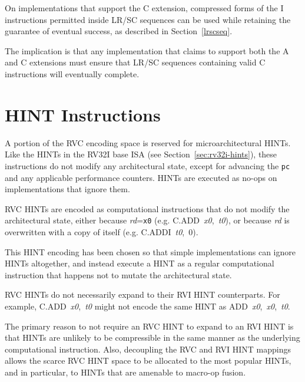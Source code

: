 On implementations that support the C extension, compressed forms of
the I instructions permitted inside LR/SC sequences can be used while
retaining the guarantee of eventual success, as described in
Section~\ref{lrscseq}.

\begin{commentary}
The implication is that any implementation that claims to support both
the A and C extensions must ensure that LR/SC sequences containing
valid C instructions will eventually complete.
\end{commentary}

\section{HINT Instructions}
\label{sec:rvc-hints}

A portion of the RVC encoding space is reserved for microarchitectural HINTs.
Like the HINTs in the RV32I base ISA (see Section~\ref{sec:rv32i-hints}),
these instructions do not modify any architectural state, except for advancing
the {\tt pc} and any applicable performance counters.  HINTs are
executed as no-ops on implementations that ignore them.

RVC HINTs are encoded as computational instructions that do not modify the
architectural state, either because {\em rd}={\tt x0}
(e.g. \mbox{C.ADD {\em x0}, {\em t0}}), or because {\em rd} is overwritten
with a copy of itself (e.g. \mbox{C.ADDI {\em t0}, 0}).

\begin{commentary}
This HINT encoding has been chosen so that simple implementations can ignore
HINTs altogether, and instead execute a HINT as a regular computational
instruction that happens not to mutate the architectural state.
\end{commentary}

RVC HINTs do not necessarily expand to their RVI HINT counterparts.  For
example, \mbox{C.ADD {\em x0}, {\em t0}} might not encode the same HINT
as \mbox{ADD {\em x0}, {\em x0}, {\em t0}}.

\begin{commentary}
The primary reason to not require an RVC HINT to expand to an RVI HINT
is that HINTs are unlikely to be compressible in the same manner as
the underlying computational instruction.  Also, decoupling the RVC
and RVI HINT mappings allows the scarce RVC HINT space to be allocated
to the most popular HINTs, and in particular, to HINTs that are
amenable to macro-op fusion.
\end{commentary}

